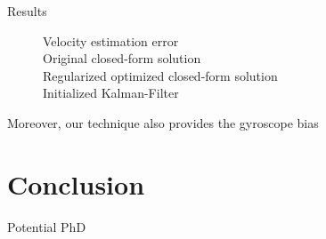 \documentclass{beamer}
\begin{document}
\begin{frame}{Results}
  \begin{figure}[h!]
    \centering
    \resizebox{\textwidth}{!}{}
    \caption{Velocity estimation error\\
      Original closed-form solution\\
      Regularized optimized closed-form solution\\
      Initialized Kalman-Filter}
  \end{figure}

  Moreover, our technique also provides the gyroscope bias

\end{frame}

\section{Conclusion}

\begin{frame}{Potential PhD}
\end{frame}


\end{document}
